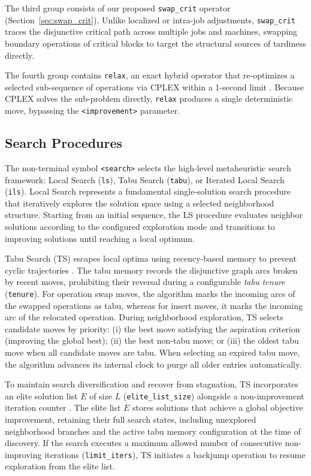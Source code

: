 The third group consists of our proposed \texttt{swap\_crit} operator (Section~\ref{sec:swap_crit}). Unlike localized or intra-job adjustments, \texttt{swap\_crit} traces the disjunctive critical path across multiple jobs and machines, swapping boundary operations of critical blocks to target the structural sources of tardiness directly.

The fourth group contains \texttt{relax}, an exact hybrid operator that re-optimizes a selected sub-sequence of operations via CPLEX within a 1-second limit \citep{ahmadian2021meta}. Because CPLEX solves the sub-problem directly, \texttt{relax} produces a single deterministic move, bypassing the \texttt{<improvement>} parameter.

\subsection{Search Procedures}
\label{subsec:search_procedures}

The non-terminal symbol \texttt{<search>} selects the high-level metaheuristic search framework: Local Search (\texttt{ls}), Tabu Search (\texttt{tabu}), or Iterated Local Search (\texttt{ils}).
Local Search represents a fundamental single-solution search procedure that iteratively explores the solution space using a selected neighborhood structure.
Starting from an initial sequence, the LS procedure evaluates neighbor solutions according to the configured exploration mode and transitions to improving solutions until reaching a local optimum.

Tabu Search (TS) escapes local optima using recency-based memory to prevent cyclic trajectories \citep{talbi}.
The tabu memory records the disjunctive graph arcs broken by recent moves, prohibiting their reversal during a configurable \emph{tabu tenure} (\texttt{tenure}).
For operation swap moves, the algorithm marks the incoming arcs of the swapped operations as tabu, whereas for insert moves, it marks the incoming arc of the relocated operation.
During neighborhood exploration, TS selects candidate moves by priority: (i) the best move satisfying the aspiration criterion (improving the global best); (ii) the best non-tabu move; or (iii) the oldest tabu move when all candidate moves are tabu.
When selecting an expired tabu move, the algorithm advances its internal clock to purge all older entries automatically.

To maintain search diversification and recover from stagnation, TS incorporates an elite solution list $E$ of size $L$ (\texttt{elite\_list\_size}) alongside a non-improvement iteration counter \citep{zubaran2018effective}.
The elite list $E$ stores solutions that achieve a global objective improvement, retaining their full search states, including unexplored neighborhood branches and the active tabu memory configuration at the time of discovery.
If the search executes a maximum allowed number of consecutive non-improving iterations (\texttt{limit\_iters}), TS initiates a backjump operation to resume exploration from the elite list.


